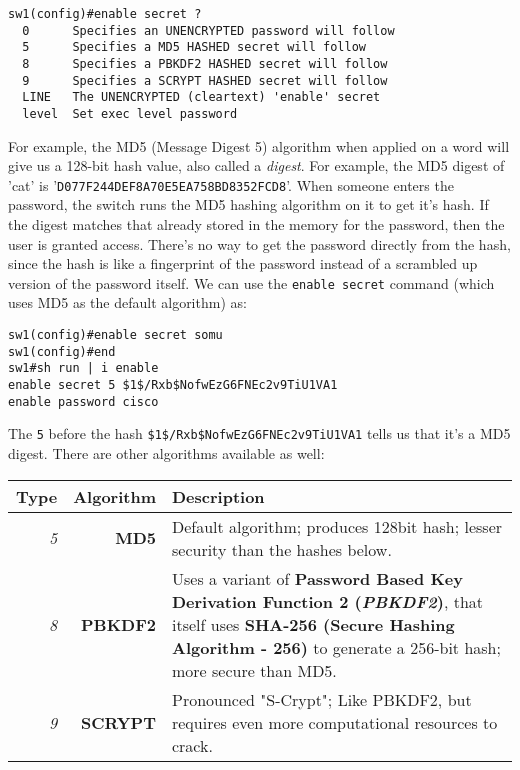 \vspace{-15pt}
\begin{verbatim}
sw1(config)#enable secret ?
  0      Specifies an UNENCRYPTED password will follow
  5      Specifies a MD5 HASHED secret will follow
  8      Specifies a PBKDF2 HASHED secret will follow
  9      Specifies a SCRYPT HASHED secret will follow
  LINE   The UNENCRYPTED (cleartext) 'enable' secret
  level  Set exec level password
\end{verbatim}
\vspace{-10pt}

\noindent
For example, the MD5 (Message Digest 5) algorithm when applied on a word will give us a 128-bit hash value, also called a \textit{digest}. For example, the MD5 digest of 'cat' is '\verb|D077F244DEF8A70E5EA758BD8352FCD8|'. When someone enters the password, the switch runs the MD5 hashing algorithm on it to get it's hash. If the digest matches that already stored in the memory for the password, then the user is granted access. There's no way to get the password directly from the hash, since the hash is like a fingerprint of the password instead of a scrambled up version of the password itself. We can use the \verb|enable secret| command (which uses MD5 as the default algorithm) as: 

\vspace{-15pt}
\begin{verbatim}
sw1(config)#enable secret somu
sw1(config)#end
sw1#sh run | i enable
enable secret 5 $1$/Rxb$NofwEzG6FNEc2v9TiU1VA1
enable password cisco
\end{verbatim}
\vspace{-10pt}

\noindent
The \verb|5| before the hash \verb|$1$/Rxb$NofwEzG6FNEc2v9TiU1VA1| tells us that it's a MD5 digest. There are other algorithms available as well:

\noindent
\begin{center}
	\begin{tabular}{rrm{}}
		\toprule
		\textbf{Type} &\textbf{Algorithm} &\textbf{Description} \\
		\midrule
		\textit{5} &\textbf{MD5}	& Default algorithm; produces 128bit hash; lesser security than the hashes below.\\
		\midrule
		\textit{8} &\textbf{PBKDF2}	&Uses a variant of \textbf{Password Based Key Derivation Function 2 (\textit{PBKDF2})}, that itself uses \textbf{SHA-256 (Secure Hashing Algorithm - 256)} to generate a 256-bit hash; more secure than MD5.\\
		\midrule
		\textit{9} &\textbf{SCRYPT}	&Pronounced "S-Crypt"; Like PBKDF2, but requires even more computational resources to crack. \\
		\bottomrule
	\end{tabular}
\end{center}

